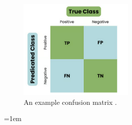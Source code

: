 \documentclass[12pt]{report}
\begin{document}
\begin{figure}[H]
    \centering
    \includegraphics[width=0.5\textwidth]{Proposal/ConfusionMatrix.png}
    \caption{An example confusion matrix \autocite{datacampWhatConfusionMatrix}. \label{fig:ConfusionMatrix}}
\end{figure}




\emergencystretch=1em
\printbibliography


\end{document}

